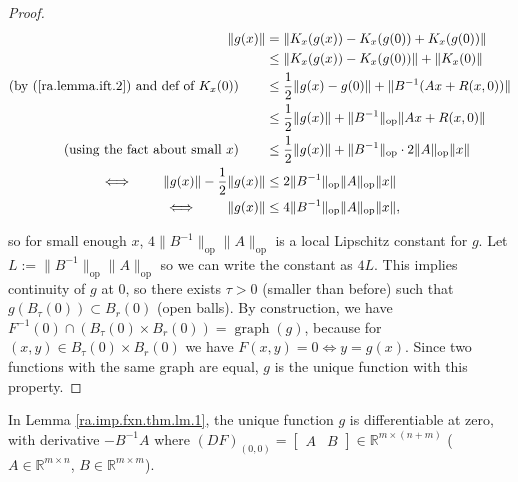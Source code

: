 \begin{proof}
\begin{align*}
\lVert g(x) \rVert & = \lVert K_x(g(x)) - K_x(g(0)) + K_x(g(0)) \rVert
\\ & \leq \lVert K_x(g(x)) - K_x(g(0)) \rVert + \lVert K_x(0) \rVert
\\ \text{(by (\ref{ra.lemma.ift.2}) and def of \(K_x(0)\))} \qquad   & \leq \frac{1}{2}  \lVert g(x) - g(0) \rVert + \lVert B^{-1}(Ax + R(x,0)) \rVert
\\  & \leq \frac{1}{2}  \lVert g(x) \rVert + \lVert B^{-1} \rVert_{\text{op}} \lVert Ax + R(x,0) \rVert
\\ \text{(using the fact about small \(x\))} \qquad & \leq \frac{1}{2}  \lVert g(x) \rVert + \lVert B^{-1} \rVert_{\text{op}} \cdot 2 \lVert A\rVert_{\text{op}} \lVert x \rVert
\\ \iff \qquad \lVert g(x) \rVert - \frac{1}{2} \lVert g(x) \rVert & \leq 2 \lVert B^{-1} \rVert_{\text{op}} \lVert A\rVert_{\text{op}} \lVert x \rVert
\\ \iff \qquad \lVert g(x) \rVert & \leq 4 \lVert B^{-1} \rVert_{\text{op}} \lVert A\rVert_{\text{op}} \lVert x \rVert,
\end{align*}

so for small enough \(x\), \( 4 \lVert B^{-1} \rVert_{\text{op}} \lVert A\rVert_{\text{op}} \) is a local Lipschitz constant for \(g\). Let \(L := \lVert B^{-1} \rVert_{\text{op}} \lVert A\rVert_{\text{op}}\) so we can write the constant as \(4L\). This implies continuity of \(g\) at 0, so there exists \(\tau > 0\) (smaller than before) such that \(g(B_{\tau}(0)) \subset B_r(0)\) (open balls). By construction, we have \(F^{-1}(0) \cap (B_\tau(0) \times B_r(0)) = \operatorname{graph}(g)\), because for \((x,y) \in B_{\tau}(0) \times B_r(0)\) we have \(F(x,y)= 0 \iff y = g(x)\). Since two functions with the same graph are equal, \(g\) is the unique function with this property.

\end{proof}

\begin{lemma}

In Lemma \ref{ra.imp.fxn.thm.lm.1}, the unique function \(g\) is differentiable at zero, with derivative \(-B^{-1}A\) where \((DF)_{(0,0)} = \begin{bmatrix} A & B \end{bmatrix} \in \mathbb{R}^{m \times (n+m)}\) (\(A \in \mathbb{R}^{m \times n}\), \(B \in \mathbb{R}^{m \times m}\)).

\end{lemma}


